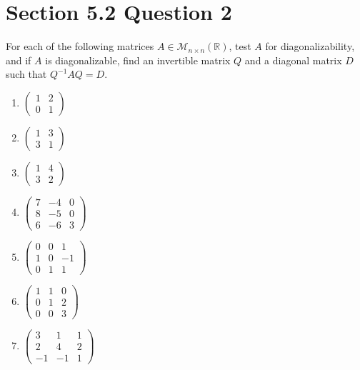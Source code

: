 \documentclass[13pt]{article}
\begin{document}
\section*{Section 5.2 Question 2}
For each of the following matrices $A \in \mathcal{M}_{n \times n}(\mathbb{R})$, test $A$ for diagonalizability, and if $A$ is diagonalizable, find an invertible matrix $Q$ and a diagonal matrix $D$ such that $Q^{-1}AQ = D$.
\begin{enumerate}[label=(\alph*),leftmargin=*]
\item $
  \begin{pmatrix}
    1 & 2 \\
    0 & 1
  \end{pmatrix}
  $
\item $
  \begin{pmatrix}
    1 & 3 \\
    3 & 1
  \end{pmatrix}
  $
\item $
  \begin{pmatrix}
    1 & 4 \\
    3 & 2
  \end{pmatrix}
  $
\item $
  \begin{pmatrix}
    7 & -4 & 0 \\
    8 & -5 & 0 \\
    6 & -6 & 3
  \end{pmatrix}
  $
\item $
  \begin{pmatrix}
    0 & 0 & 1 \\
    1 & 0 & -1 \\
    0 & 1 & 1
  \end{pmatrix}
  $
\item $
  \begin{pmatrix}
    1 & 1 & 0 \\
    0 & 1 & 2 \\
    0 & 0 & 3
  \end{pmatrix}
  $
\item $
  \begin{pmatrix}
    3 & 1 & 1 \\
    2 & 4 & 2 \\
    -1 & -1 & 1
  \end{pmatrix}
  $
\end{enumerate}
\end{document}
